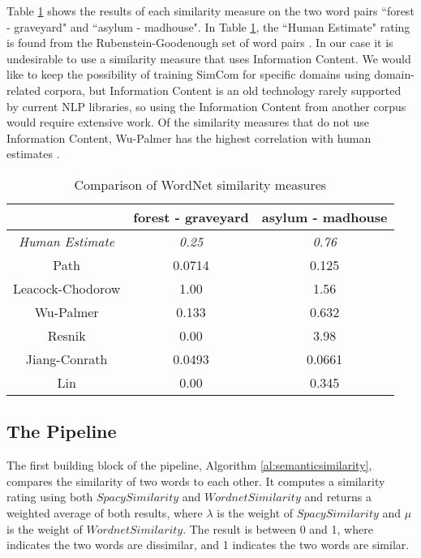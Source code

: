 \documentclass{article}
\begin{document}
Table \ref{table:wordnetsimilarity} shows the results of each similarity measure on the two word pairs ``forest - graveyard" and ``asylum - madhouse". In Table \ref{table:wordnetsimilarity}, the ``Human Estimate" rating is found from the Rubenstein-Goodenough set of word pairs \cite{rubenstein1965contextual}. In our case it is undesirable to use a similarity measure that uses Information Content. We would like to keep the possibility of training SimCom for specific domains using domain-related corpora, but Information Content is an old technology rarely supported by current NLP libraries, so using the Information Content from another corpus would require extensive work. Of the similarity measures that do not use Information Content, Wu-Palmer has the highest correlation with human estimates \citep{budanitsky2006evaluating,seco2004intrinsic,mihalcea2006corpus}. %

\begin{table}[h!]
\caption{Comparison of WordNet similarity measures} %
\centering
\begin{tabular}{|c||c|c|}
	\hline
	& forest - graveyard & asylum - madhouse \\
	\hline
	\textit{Human Estimate} & \textit{0.25} & \textit{0.76} \\
	Path & 0.0714 & 0.125 \\
	Leacock-Chodorow & 1.00 & 1.56 \\
	Wu-Palmer & 0.133 & 0.632 \\
	Resnik & 0.00 & 3.98 \\
	Jiang-Conrath & 0.0493 & 0.0661 \\
	Lin & 0.00 & 0.345 \\
	\hline
\end{tabular}
\label{table:wordnetsimilarity}
\end{table}

\subsection{The Pipeline}

The first building block of the pipeline, Algorithm \ref{al:semanticsimilarity}, compares the similarity of two words to each other. It computes a similarity rating using both $\textit{SpacySimilarity}$ and $\textit{WordnetSimilarity}$ and returns a weighted average of both results, where $\lambda$ is the weight of $\textit{SpacySimilarity}$ and $\mu$ is the weight of $\textit{WordnetSimilarity}$. The result is between 0 and 1, where indicates the two words are dissimilar, and 1 indicates the two words are similar.
\end{document}
